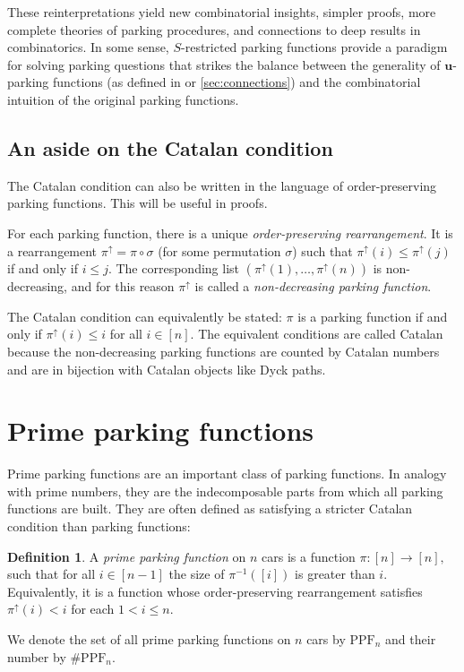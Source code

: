 \documentclass[12 pt]{amsart}
\theoremstyle{definition} %
\newtheorem{definition}[theorem]{Definition}
\theoremstyle{remark} %
\begin{document}
These reinterpretations yield new combinatorial insights, simpler proofs, more complete theories of parking procedures, and connections to deep results in combinatorics. In some sense, $S$-restricted parking functions provide a paradigm for solving parking questions that strikes the balance between the generality of $\mathbf{u}$-parking functions (as defined in \cite{yan-survey-2015} or \cref{sec:connections}) and the combinatorial intuition of the original parking functions.

\subsection{An aside on the Catalan condition}

The Catalan condition can also be written in the language of order-preserving parking functions. This will be useful in proofs.

For each parking function, there is a unique \emph{order-preserving rearrangement}. It is a rearrangement $\pi^{\uparrow} = \pi \circ \sigma$ (for some permutation $\sigma$) such that $\pi^\uparrow(i)\le \pi^\uparrow(j)$ if and only if $i\le j$. The corresponding list $(\pi^{\uparrow}(1), \dots, \pi^{\uparrow}(n))$ is non-decreasing, and for this reason $\pi^{\uparrow}$ is called a \emph{non-decreasing parking function}. 

The Catalan condition can equivalently be stated: $\pi$ is a parking function if and only if $\pi^\uparrow(i) \le i$ for all $i \in [n]$. The equivalent conditions are called Catalan because the non-decreasing parking functions are counted by Catalan numbers and are in bijection with Catalan objects like Dyck paths.

\section{Prime parking functions} \label{primesection}

Prime parking functions are an important class of parking functions. In analogy with prime numbers, they are the indecomposable parts from which all parking functions are built. They are often defined as satisfying a stricter Catalan condition than parking functions:

\begin{definition}
	A \emph{prime parking function} on $n$ cars is a function $\pi : [n] \to [n],$ such that for all $i\in[n-1]$ the size of $\pi^{-1}([i])$ is greater than $i$. Equivalently, it is a function whose order-preserving rearrangement satisfies $ \pi^{\uparrow}(i) < i$ for each $1<i\le n$. 

	We denote the set of all prime parking functions on $n$ cars by $\mathrm{PPF}_{n}$ and their number by $\# \mathrm{P P F}_{n}$.
\end{definition}
\end{document}
